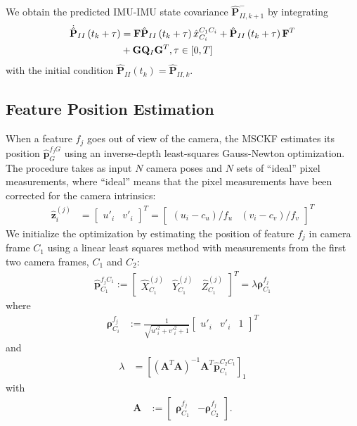 \documentclass[letterpaper, 10 pt, conference]{ieeeconf}  %
\def\Vec#1{\mathbf{#1}}
\newcommand{\bbm}{\begin{bmatrix}}
\newcommand{\ebm}{\end{bmatrix}}
\begin{document}
We obtain the predicted IMU-IMU state covariance $\hat{\Vec{P}}^-_{II,k+1}$ by integrating
\begin{align} \label{eq:imucovar}
    \dot{\hat{\Vec{P}}}_{II}\left(t_k  + \tau \right) &= \Vec{F} \hat{\Vec{P}}_{II}\left(t_k  + \tau \right) 
                \hat{x}_{C_i}^{C_1 C_i} + \hat{\Vec{P}}_{II}\left(t_k  + \tau \right) \Vec{F}^T \notag \\ 
                & + \Vec{G} \Vec{Q}_I \Vec{G}^T, \tau\in\left[0,T\right]
\end{align}
with the initial condition $\hat{\Vec{P}}_{II}\left(t_k\right) = \hat{\Vec{P}}_{II,k}$. 

\subsection{Feature Position Estimation}
When a feature $f_j$ goes out of view of the camera, the MSCKF estimates its position $\hat{\Vec{p}}_G^{f_j G}$ using an inverse-depth least-squares Gauss-Newton optimization. 
The procedure takes as input $N$ camera poses and $N$ sets of ``ideal'' pixel measurements, where ``ideal'' means that the pixel measurements have been corrected for the camera intrinsics:
\begin{align}
\hat{\Vec{z}}_i^{(j)} &= \bbm u'_i & v'_i \ebm ^T = \bbm (u_i - c_u)/f_u & (v_i - c_v)/f_v \ebm ^T
\end{align}
We initialize the optimization by estimating the position of feature $f_j$ in camera frame $C_1$ using a linear least squares method with measurements from the first two camera frames, $C_1$ and $C_2$:
\begin{align}
\hat{\Vec{p}}_{C_1}^{f_j C_1} := \bbm \hat{X}^{(j)}_{C_1} & \hat{Y}^{(j)}_{C_1} & \hat{Z}^{(j)}_{C_1} \ebm ^T = \lambda \boldsymbol{\rho}_{C_1}^{f_j}
\end{align}
where
\begin{align}
\boldsymbol{\rho}_{C_i}^{f_j} &:= \frac{1}{\sqrt{u'^2_i + v'^2_i + 1}}\bbm u'_i & v'_i & 1\ebm^T
\end{align}
and
\begin{align}
\lambda &= \left[(\Vec A^T \Vec A)^{-1} \Vec A^T \hat{\Vec{p}}_{C_1}^{C_2 C_1} \right]_1
\end{align}
with
\begin{align}
\Vec A &:= \bbm \boldsymbol{\rho}_{C_1}^{f_j} & -\boldsymbol{\rho}_{C_2}^{f_j} \ebm.
\end{align}
\end{document}
